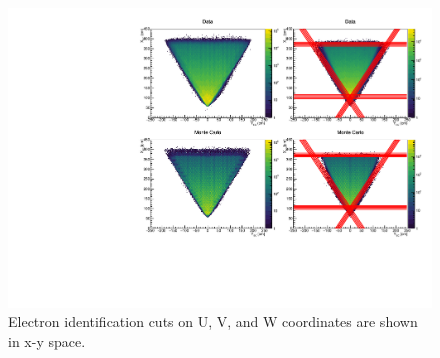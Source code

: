 \begin{figure}
  \centering
  \label{fig:systematics-ec-fid}
  \includegraphics[width=\textwidth]{image/plots/sidis/systematics/ec_fid_sect1.pdf}
  \caption[Variation of EC U, V, and W cuts used to identify electrons.]{Electron identification cuts on U, V, and W coordinates are shown in x-y space.}
\end{figure}


